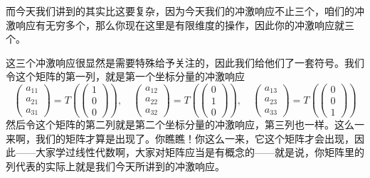 \documentclass[a4paper,12pt]{article}
\begin{document}
而今天我们讲到的其实比这要复杂，因为今天我们的冲激响应不止三个，咱们的冲激响应有无穷多个，那么你现在这里是有限维度的操作，因此你的冲激响应就三个。

这三个冲激响应很显然是需要特殊给予关注的，因此我们给他们了一套符号。我们令这个矩阵的第一列，就是第一个坐标分量的冲激响应
\begin{equation}
\begin{pmatrix}  
  a_{11}  \\  
  a_{21}  \\  
  a_{31}  
\end{pmatrix}=
T \left (
\begin{pmatrix}  
  1  \\  
  0  \\  
  0   
\end{pmatrix}
\right ),\quad
\begin{pmatrix}  
  a_{12}  \\  
  a_{22}  \\  
  a_{32}  
\end{pmatrix}=
T \left (
\begin{pmatrix}  
  0  \\  
  1  \\  
  0   
\end{pmatrix}
\right ),\quad
\begin{pmatrix}  
  a_{13}  \\  
  a_{23}  \\  
  a_{33}  
\end{pmatrix}=
T \left (
\begin{pmatrix}  
  0  \\  
  0  \\  
  1   
\end{pmatrix}
\right )
\end{equation}
然后令这个矩阵的第二列就是第二个坐标分量的冲激响应，第三列也一样。这么一来啊，我们的矩阵才算是出现了。你瞧瞧！你这么一来，它这个矩阵才会出现，因此——大家学过线性代数啊，大家对矩阵应当是有概念的——就是说，你矩阵里的列代表的实际上就是我们今天所讲到的冲激响应。
\end{document}
